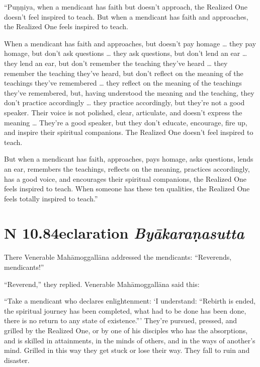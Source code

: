 \documentclass[12pt,openany]{book}%
\newcommand*{\suttatitleacronym}[1]{\smaller[2]{#1}\vspace*{.3em}}
\newcommand*{\suttatitletranslation}[1]{\linebreak{#1}}
\newcommand*{\suttatitleroot}[1]{\linebreak\smaller[2]\itshape{#1}}
\newcommand*{\tocacronym}[1]{\hspace*{-3.3em}{#1}\quad}
\newcommand*{\toctranslation}[1]{#1}
\newcommand*{\tocroot}[1]{(\textit{#1})}
\begin{document}
“\textsanskrit{Puṇṇiya}, when a mendicant has faith but doesn’t approach, the Realized One doesn’t feel inspired to teach. But when a mendicant has faith and approaches, the Realized One feels inspired to teach. 

When a mendicant has faith and approaches, but doesn’t pay homage … they pay homage, but don’t ask questions … they ask questions, but don’t lend an ear … they lend an ear, but don’t remember the teaching they’ve heard … they remember the teaching they’ve heard, but don’t reflect on the meaning of the teachings they’ve remembered … they reflect on the meaning of the teachings they’ve remembered, but, having understood the meaning and the teaching, they don’t practice accordingly … they practice accordingly, but they’re not a good speaker. Their voice is not polished, clear, articulate, and doesn’t express the meaning … They’re a good speaker, but they don’t educate, encourage, fire up, and inspire their spiritual companions. The Realized One doesn’t feel inspired to teach. 

But when a mendicant has faith, approaches, pays homage, asks questions, lends an ear, remembers the teachings, reflects on the meaning, practices accordingly, has a good voice, and encourages their spiritual companions, the Realized One feels inspired to teach. When someone has these ten qualities, the Realized One feels totally inspired to teach.” 

%
\section*{{\suttatitleacronym AN 10.84}{\suttatitletranslation Declaration }{\suttatitleroot Byākaraṇasutta}}
\addcontentsline{toc}{section}{\tocacronym{AN 10.84} \toctranslation{Declaration } \tocroot{Byākaraṇasutta}}

There Venerable \textsanskrit{Mahāmoggallāna} addressed the mendicants: “Reverends, mendicants!” 

“Reverend,” they replied. Venerable \textsanskrit{Mahāmoggallāna} said this: 

“Take a mendicant who declares enlightenment: ‘I understand: “Rebirth is ended, the spiritual journey has been completed, what had to be done has been done, there is no return to any state of existence.”’ They’re pursued, pressed, and grilled by the Realized One, or by one of his disciples who has the absorptions, and is skilled in attainments, in the minds of others, and in the ways of another’s mind. Grilled in this way they get stuck or lose their way. They fall to ruin and disaster. 
\end{document}
